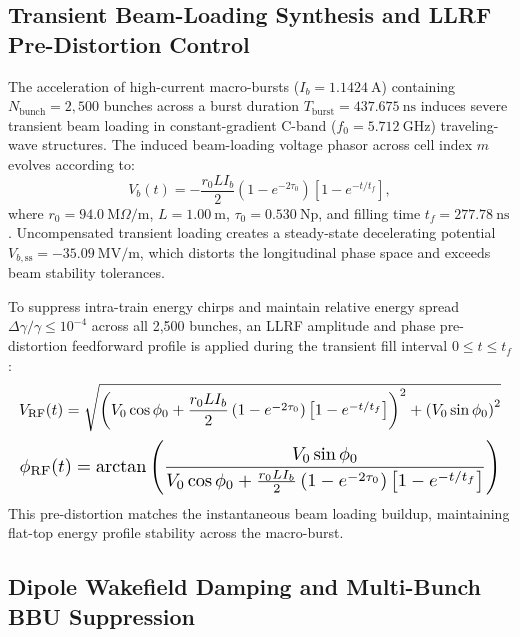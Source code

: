 
\subsection{Transient Beam-Loading Synthesis and LLRF Pre-Distortion Control}
\label{subsec:beam_loading_llrf}

The acceleration of high-current macro-bursts ($I_b = 1.1424~\text{A}$) containing $N_{\text{bunch}} = 2,500$ bunches across a burst duration $T_{\text{burst}} = 437.675~\text{ns}$ induces severe transient beam loading in constant-gradient C-band ($f_0 = 5.712~\text{GHz}$) traveling-wave structures. The induced beam-loading voltage phasor across cell index $m$ evolves according to:
\begin{equation}
    V_b(t) = -\frac{r_0 L I_b}{2} \left(1 - e^{-2\tau_0}\right) \left[ 1 - e^{-t/t_f} \right],
    \label{eq:beam_loading_phasor}
\end{equation}
where $r_0 = 94.0~\text{M}\Omega/\text{m}$, $L = 1.00~\text{m}$, $\tau_0 = 0.530~\text{Np}$, and filling time $t_f = 277.78~\text{ns}$. Uncompensated transient loading creates a steady-state decelerating potential $V_{b,\text{ss}} = -35.09~\text{MV/m}$, which distorts the longitudinal phase space and exceeds beam stability tolerances.

To suppress intra-train energy chirps and maintain relative energy spread $\Delta\gamma/\gamma \le 10^{-4}$ across all 2,500 bunches, an LLRF amplitude and phase pre-distortion feedforward profile is applied during the transient fill interval $0 \le t \le t_f$:
\begin{equation}
\resizebox{\columnwidth}{!}{$\displaystyle
    V_{\text{RF}}(t) = \sqrt{\left(V_0 \cos\phi_0 + \frac{r_0 L I_b}{2}\left(1 - e^{-2\tau_0}\right)\left[1 - e^{-t/t_f}\right]\right)^2 + \left(V_0 \sin\phi_0\right)^2}$}
\label{eq:llrf_amplitude_predistortion}
\end{equation}
\begin{equation}
\resizebox{\columnwidth}{!}{$\displaystyle
    \phi_{\text{RF}}(t) = \arctan\left(\frac{V_0 \sin\phi_0}{V_0 \cos\phi_0 + \frac{r_0 L I_b}{2}\left(1 - e^{-2\tau_0}\right)\left[1 - e^{-t/t_f}\right]}\right)$}
\label{eq:llrf_phase_predistortion}
\end{equation}
This pre-distortion matches the instantaneous beam loading buildup, maintaining flat-top energy profile stability across the macro-burst.





\subsection{Dipole Wakefield Damping and Multi-Bunch BBU Suppression}
\label{subsec:dipole_bbu}


